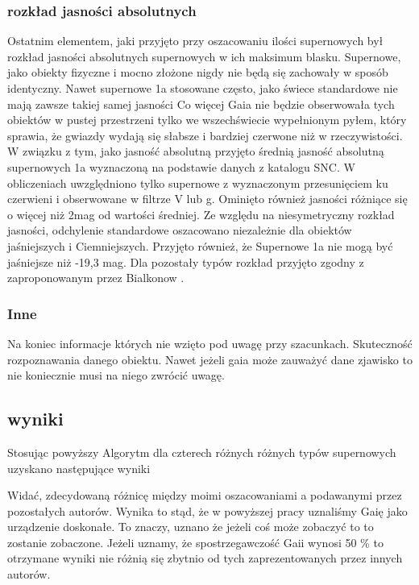 \documentclass[polish,12pt]{pracamgr}
\begin{document}
\subsubsection{rozkład jasności absolutnych}
Ostatnim elementem, jaki przyjęto przy oszacowaniu ilości supernowych był rozkład jasności absolutnych supernowych w ich maksimum blasku. Supernowe, jako obiekty fizyczne i mocno złożone nigdy nie będą się zachowały w sposób identyczny. Nawet supernowe 1a stosowane często, jako świece standardowe nie mają zawsze takiej samej jasności Co więcej Gaia nie będzie obserwowała tych obiektów w pustej przestrzeni tylko we wszechświecie wypełnionym pyłem, który sprawia, że gwiazdy wydają się słabsze i bardziej czerwone niż w rzeczywistości. W związku z tym, jako jasność absolutną przyjęto średnią jasność absolutną supernowych 1a wyznaczoną na podstawie danych z katalogu SNC. W obliczeniach uwzględniono tylko supernowe z wyznaczonym przesunięciem ku czerwieni i obserwowane w filtrze V lub g. Ominięto również jasności różniące się o więcej niż 2mag od wartości średniej. Ze względu na niesymetryczny rozkład jasności, odchylenie standardowe oszacowano niezależnie dla obiektów jaśniejszych i Ciemniejszych. Przyjęto również, że Supernowe 1a nie mogą być jaśniejsze niż -19,3 mag. Dla pozostały typów rozkład przyjęto zgodny z zaproponowanym przez Bialkonow .

\subsubsection{Inne}
Na koniec informacje których nie wzięto pod uwagę przy szacunkach. Skuteczność rozpoznawania danego obiektu. Nawet jeżeli gaia 		może zauważyć dane zjawisko to nie koniecznie musi na niego zwrócić uwagę.

\subsection{wyniki}
Stosując powyższy Algorytm dla czterech różnych  różnych typów supernowych uzyskano następujące wyniki



Widać, zdecydowaną różnicę między moimi oszacowaniami a podawanymi przez pozostałych autorów. Wynika to stąd, że w powyższej pracy uznaliśmy Gaię jako urządzenie doskonałe. To znaczy, uznano że jeżeli coś może zobaczyć to to zostanie zobaczone. Jeżeli uznamy, że spostrzegawczość Gaii wynosi 50 \% to otrzymane wyniki nie różnią się zbytnio od tych zaprezentowanych przez innych autorów.
\end{document}
